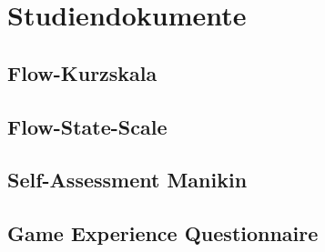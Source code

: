 

\chapter{Studiendokumente} 

\label{cha:studiendokumente}

\section{Flow-Kurzskala} 

\label{sec:flow_kurzskala}

\section{Flow-State-Scale} 

\label{sec:flow_state_scale}


\section{Self-Assessment Manikin} %
\label{sec:self_assessment_manikin}


\section{Game Experience Questionnaire} %
\label{sec:game_experience_questionnaire}


